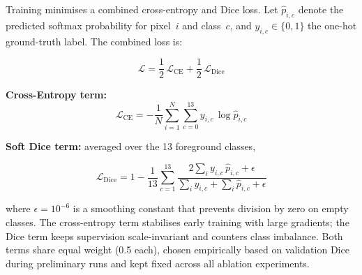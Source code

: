 Training minimises a combined cross-entropy and Dice loss. Let $\hat{p}_{i,c}$ denote the predicted softmax probability for pixel~$i$ and class~$c$, and $y_{i,c} \in \{0, 1\}$ the one-hot ground-truth label. The combined loss is:

\begin{equation}
  \mathcal{L} = \frac{1}{2}\,\mathcal{L}_{\mathrm{CE}} + \frac{1}{2}\,\mathcal{L}_{\mathrm{Dice}}
  \label{eq:combined_loss}
\end{equation}

\noindent\textbf{Cross-Entropy term:}
\begin{equation}
  \mathcal{L}_{\mathrm{CE}} = -\frac{1}{N}\sum_{i=1}^{N}\sum_{c=0}^{13}
  y_{i,c}\,\log\hat{p}_{i,c}
\end{equation}

\noindent\textbf{Soft Dice term:} averaged over the 13 foreground classes,

\begin{equation}
  \mathcal{L}_{\mathrm{Dice}} = 1 - \frac{1}{13}\sum_{c=1}^{13}
  \frac{2\sum_i y_{i,c}\,\hat{p}_{i,c} + \epsilon}
       {\sum_i y_{i,c} + \sum_i \hat{p}_{i,c} + \epsilon}
\end{equation}

where $\epsilon = 10^{-6}$ is a smoothing constant that prevents division by zero on empty classes. The cross-entropy term stabilises early training with large gradients; the Dice term keeps supervision scale-invariant and counters class imbalance. Both terms share equal weight (0.5 each), chosen empirically based on validation Dice during preliminary runs and kept fixed across all ablation experiments.